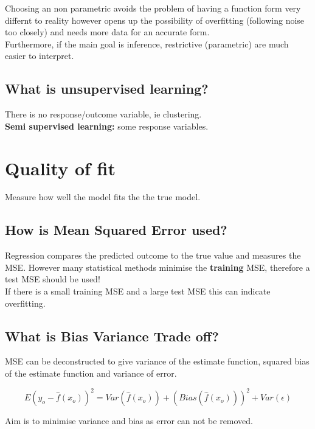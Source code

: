 \documentclass[11pt]{scrartcl} %
\begin{document}
Choosing an non parametric avoids the problem of having a function form very differnt to reality however opens up
the possibility of overfitting (following noise too closely) and needs more data for an accurate form.\\

Furthermore, if the main goal is inference, restrictive (parametric) are much easier to interpret.

\subsection{What is unsupervised learning?}

There is no response/outcome variable, ie clustering.\\

\textbf{Semi supervised learning:} some response variables.

\section{Quality of fit}

Measure how well the model fits the the true model.

\subsection{How is Mean Squared Error used?}

Regression compares the predicted outcome to the true value and measures the MSE. However many
statistical methods minimise the \textbf{training} MSE, therefore a test MSE should be used!\\

If there is a small training MSE and a large test MSE this can indicate overfitting.

\subsection{What is Bias Variance Trade off?}

MSE can be deconstructed to give variance of the estimate function, squared bias of the estimate function
and variance of error.

\begin{equation}
	E(y_o - \hat{f}(x_o))^2 = Var(\hat{f}(x_o)) + (Bias(\hat{f}(x_o)))^2 + Var(\epsilon)
\end{equation}

Aim is to minimise variance and bias as error can not be removed.
\end{document}
